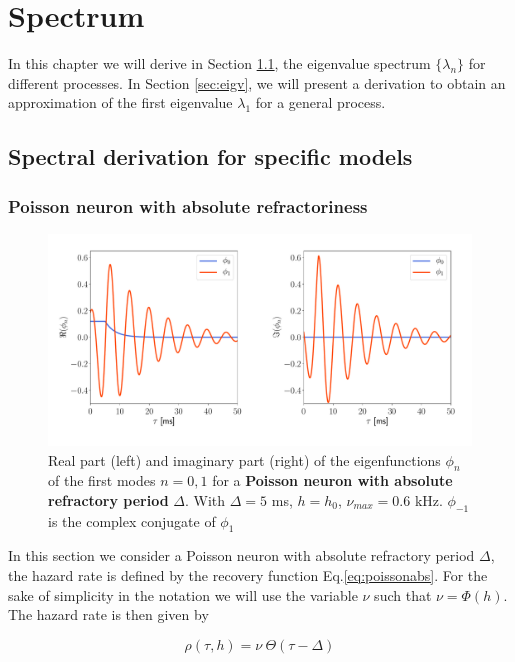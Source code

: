 \documentclass[12pt,twoside]{report}
\begin{document}
\chapter{Spectrum}
\label{chap:spectrum}

In this chapter we will derive in Section \ref{sec:specif-model}, the eigenvalue spectrum $\{\lambda_n\}$ for different processes. In Section \ref{sec:eigv}, we will present a derivation to obtain an approximation of the first eigenvalue $\lambda_1$ for a general process.

\section{Spectral derivation for specific models}
\label{sec:specif-model}


\subsection{Poisson neuron with absolute refractoriness}
\label{subsec:absref}

\begin{figure}[h!]
	\centering
	\includegraphics[width=0.8\linewidth]{poisson_eigenfunction2.pdf}
	\caption{Real part (left) and imaginary part (right) of the eigenfunctions $\phi_n$ of the first modes $n=0,1$ for a \textbf{Poisson neuron with absolute refractory period} $\Delta$. With $\Delta=5$ ms, $h=h_0$, $\nu_{max}=0.6$ kHz. $\phi_{-1}$ is the complex conjugate of $\phi_{1}$}
	\label{fig:poissoneigenfunction}
\end{figure} 

In this section we consider a Poisson neuron with absolute refractory period $\Delta$, the hazard rate is defined by the recovery function Eq.\eqref{eq:poissonabs}. For the sake of simplicity in the notation we will use the variable $\nu$ such that $\nu=\Phi(h)$. The hazard rate is then given by

\begin{equation}
\rho(\tau,h)=\nu\:\Theta(\tau-\Delta)
\end{equation}
\end{document}
